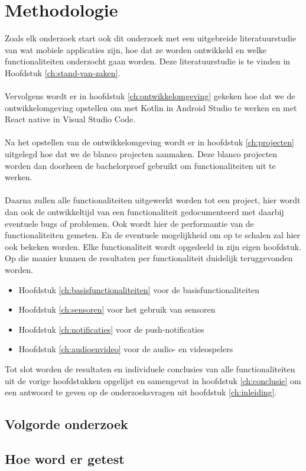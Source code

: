 
\chapter{Methodologie}
\label{ch:methodologie}

Zoals elk onderzoek start ook dit onderzoek met een uitgebreide literatuurstudie van wat mobiele applicaties zijn, 
hoe dat ze worden ontwikkeld en welke functionaliteiten onderzocht gaan worden. Deze literatuurstudie is te vinden in Hoofdstuk \ref{ch:stand-van-zaken}.
\\\\
Vervolgens wordt er in hoofdstuk \ref{ch:ontwikkelomgeving} gekeken hoe dat we de ontwikkelomgeving opstellen om met Kotlin in Android Studio 
te werken en met React native in Visual Studio Code.
\\\\
Na het opstellen van de ontwikkelomgeving wordt er in hoofdstuk \ref{ch:projecten} uitgelegd hoe dat we de blanco projecten aanmaken. 
Deze blanco projecten worden dan doorheen de bachelorproef gebruikt om functionaliteiten uit te werken.
\\\\
Daarna zullen alle functionaliteiten uitgewerkt worden tot een project, hier wordt dan ook de ontwikkeltijd van een functionaliteit 
gedocumenteerd met daarbij eventuele bugs of problemen. Ook wordt hier de performantie van de functionaliteiten gemeten. 
En de eventuele mogelijkheid om op te schalen zal hier ook bekeken worden. Elke functionaliteit wordt opgedeeld in zijn eigen hoofdstuk. 
Op die manier kunnen de resultaten per functionaliteit duidelijk teruggevonden worden.
\begin{itemize}
    \item Hoofdstuk \ref{ch:basisfunctionaliteiten} voor de basisfunctionaliteiten
    \item Hoofdstuk \ref{ch:sensoren} voor het gebruik van sensoren
    \item Hoofdstuk \ref{ch:notificaties} voor de push-notificaties
    \item Hoofdstuk \ref{ch:audioenvideo} voor de audio- en videospelers
\end{itemize}
Tot slot worden de resultaten en individuele conclusies van alle functionaliteiten uit de vorige hoofdstukken opgelijst en samengevat 
in hoofdstuk \ref{ch:conclusie} om een antwoord te geven op de onderzoeksvragen uit hoofdstuk \ref{ch:inleiding}.

\section{Volgorde onderzoek}



\section{Hoe word er getest}



